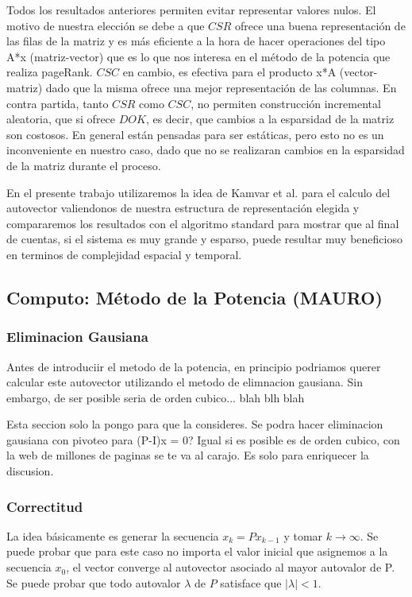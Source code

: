 Todos los resultados anteriores permiten evitar representar valores nulos.	
El motivo de nuestra elección se debe a que $CSR$ ofrece una buena representación de las filas de la matriz y es más eficiente a la hora de hacer operaciones del tipo A*x (matriz-vector) que es lo que nos interesa en el método de la potencia que realiza pageRank. $CSC$ en cambio, es efectiva para el producto x*A (vector-matriz) dado que la misma ofrece una mejor representación de las columnas. En contra partida, tanto $CSR$ como $CSC$, no permiten construcción incremental aleatoria, que si ofrece $DOK$, es decir, que cambios a la esparsidad de la matriz son costosos. En general están pensadas para ser estáticas, pero esto no es un inconveniente en nuestro caso, dado que no se realizaran cambios en la esparsidad de la matriz durante el proceso.

En el presente trabajo utilizaremos la idea de Kamvar et al. \cite[Algoritmo 1]{Kamvar2003} para el calculo del autovector valiendonos de nuestra estructura de representación elegida y compararemos los resultados con el algoritmo standard para mostrar que al final de cuentas, si el sistema es muy grande y esparso, puede resultar muy beneficioso en terminos de complejidad espacial y temporal.

\subsection{Computo: Método de la Potencia (MAURO)}

\subsubsection{Eliminacion Gausiana}

Antes de introduciir el metodo de la potencia, en principio podriamos querer calcular este autovector utilizando el metodo de elimnacion gausiana. Sin embargo, de ser posible seria de orden cubico... blah blh blah

Esta seccion solo la pongo para que la consideres. Se podra hacer eliminacion gausiana con pivoteo para (P-I)x = 0? Igual si es posible es de orden cubico, con la web de millones de paginas se te va al carajo. Es solo para enriquecer la discusion.

\subsubsection{Correctitud}

La idea básicamente es generar la secuencia $x_k = Px_{k-1}$ y tomar $k\to\infty$. Se puede probar que para este caso no importa el valor inicial que asignemos a la secuencia $x_0$, el vector converge al autovector asociado al mayor autovalor de P. Se puede probar que todo autovalor $\lambda$ de $P$ satisface que $|\lambda| < 1$.

